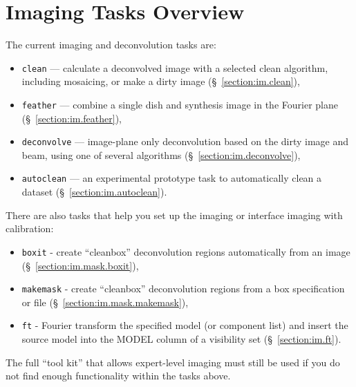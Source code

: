 \section{Imaging Tasks Overview}
\label{section:im.tasks}

The current imaging and deconvolution tasks are:
\begin{itemize}
   \item {\tt clean} --- calculate a deconvolved image with a selected clean
         algorithm, including mosaicing, or make a dirty image
         (\S~\ref{section:im.clean}),
   \item {\tt feather} --- combine a single dish and synthesis image in the
         Fourier plane (\S~\ref{section:im.feather}),
   \item {\tt deconvolve} --- image-plane only deconvolution based on
         the dirty image and beam, using one of several algorithms
         (\S~\ref{section:im.deconvolve}),
   \item {\tt autoclean} --- an experimental prototype task to
         automatically clean a dataset
         (\S~\ref{section:im.autoclean}).
\end{itemize}

There are also tasks that help you set up the imaging or interface
imaging with calibration:

\begin{itemize}
   \item {\tt boxit} - create ``cleanbox'' deconvolution regions automatically
         from an image
	 (\S~\ref{section:im.mask.boxit}),
   \item {\tt makemask} - create ``cleanbox'' deconvolution regions
         from a box specification or file (\S~\ref{section:im.mask.makemask}),
   \item {\tt ft} - Fourier transform the specified model (or component
         list) and insert the source model into the MODEL column of a
         visibility set (\S~\ref{section:im.ft}).
\end{itemize}

The full ``tool kit'' that allows expert-level imaging must still be
used if you do not find enough functionality within the tasks above. 

